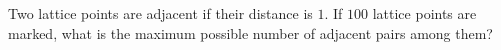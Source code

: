 Two lattice points are adjacent if their distance is $1$. If $100$ lattice points are marked, what is the maximum possible number of adjacent pairs among them?
